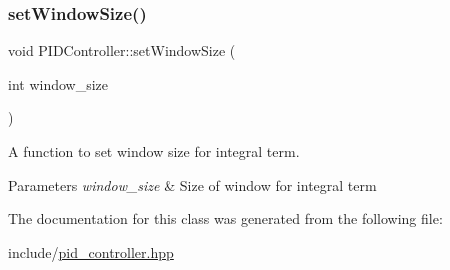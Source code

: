 \subsubsection{\texorpdfstring{set\+Window\+Size()}{setWindowSize()}}
{\footnotesize\ttfamily void P\+I\+D\+Controller\+::set\+Window\+Size (\begin{DoxyParamCaption}\item[{int}]{window\+\_\+size }\end{DoxyParamCaption})}



A function to set window size for integral term. 


\begin{DoxyParams}{Parameters}
{\em window\+\_\+size} & Size of window for integral term \\
\hline
\end{DoxyParams}


The documentation for this class was generated from the following file\+:\begin{DoxyCompactItemize}
\item 
include/\hyperlink{pid__controller_8hpp}{pid\+\_\+controller.\+hpp}\end{DoxyCompactItemize}
